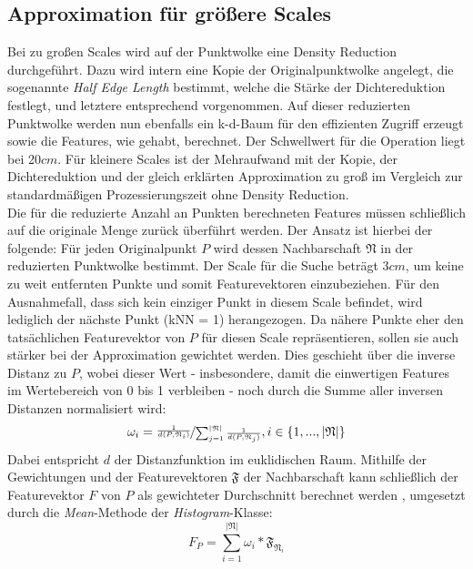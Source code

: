 \subsection{Approximation für größere Scales} 

Bei zu großen Scales wird auf der Punktwolke eine Density Reduction durchgeführt. Dazu wird intern eine Kopie der Originalpunktwolke angelegt, die sogenannte \textit{Half Edge Length} bestimmt, welche die Stärke der Dichtereduktion festlegt, und letztere entsprechend vorgenommen. Auf dieser reduzierten Punktwolke werden nun ebenfalls ein k-d-Baum für den effizienten Zugriff erzeugt sowie die Features, wie gehabt, berechnet. Der Schwellwert für die Operation liegt bei 20$cm$. Für kleinere Scales ist der Mehraufwand mit der Kopie, der Dichtereduktion und der gleich erklärten Approximation zu groß im Vergleich zur standardmäßigen Prozessierungszeit ohne Density Reduction. \\
Die für die reduzierte Anzahl an Punkten berechneten Features müssen schließlich auf die originale Menge zurück überführt werden. Der Ansatz ist hierbei der folgende: Für jeden Originalpunkt $P$ wird dessen Nachbarschaft $\mathfrak{N}$ in der reduzierten Punktwolke bestimmt. Der Scale für die Suche beträgt 3$cm$, um keine zu weit entfernten Punkte und somit Featurevektoren einzubeziehen. Für den Ausnahmefall, dass sich kein einziger Punkt in diesem Scale befindet, wird lediglich der nächste Punkt (kNN = 1) herangezogen. Da nähere Punkte eher den tatsächlichen Featurevektor von $P$ für diesen Scale repräsentieren, sollen sie auch stärker bei der Approximation gewichtet werden. Dies geschieht über die inverse Distanz zu $P$, wobei dieser Wert - insbesondere, damit die einwertigen Features im Wertebereich von 0 bis 1 verbleiben - noch durch die Summe aller inversen Distanzen normalisiert wird:
\begin{equation}
    \omega_i = \nicefrac{\frac{1}{d(P, \mathfrak{N}_i)}}{\sum_{j = 1}^{|\mathfrak{N}|}{\frac{1}{d(P, \mathfrak{N}_j)}}}, i \in \{1, ..., |\mathfrak{N}|\}
\end{equation}
Dabei entspricht $d$ der Distanzfunktion im euklidischen Raum. Mithilfe der Gewichtungen und der Featurevektoren $\mathfrak{F}$ der Nachbarschaft kann schließlich der Featurevektor $F$ von $P$ als gewichteter Durchschnitt berechnet werden \citep{Rusu.etal-2009}, umgesetzt durch die \textit{Mean}-Methode der \textit{Histogram}-Klasse:
\begin{equation}
    F_P = \sum\limits_{i = 1}^{|\mathfrak{N}|}{\omega_i * \mathfrak{F}_{\mathfrak{N}_i}}
\end{equation}

